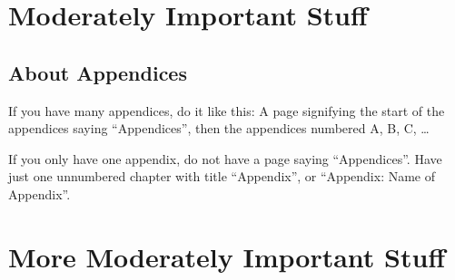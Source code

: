 \appendices
\appendixpage
\chapter{Moderately Important Stuff}
\section{About Appendices}
If you have many appendices, do it like this: A page signifying the start of the appendices saying ``Appendices'', then the appendices numbered A, B, C, \ldots

If you only have one appendix, do not have a page saying ``Appendices''. Have just one unnumbered chapter with title ``Appendix'', or ``Appendix: Name of Appendix''. 

\chapter{More Moderately Important Stuff}